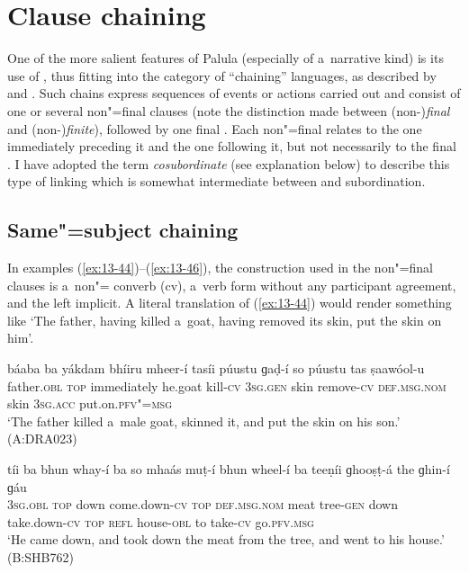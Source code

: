 \section{Clause chaining}
\label{sec:13-3}

One of the more salient features of Palula  (especially of a~narrative kind) is its use of , thus fitting into the category of ``chaining'' languages, as described by \citet[242]{thompsonetal2007} and \citet[374--376]{longacre2007}. Such  chains express sequences of events or actions carried out and consist of one or several non"=final clauses (note the distinction made between (non-)\textit{final} and (non-)\textit{finite}), followed by one final . Each non"=final  relates to the one immediately preceding it and the one following it, but not necessarily to the final . I have adopted the term \textit{cosubordinate} (see explanation below) to describe this type of  linking which is somewhat intermediate between  and subordination.


\subsection{Same"={subject} chaining}
\label{subsec:13-3-1}

In examples (\ref{ex:13-44})--(\ref{ex:13-46}), the construction used in the non"=final clauses is a~non"= converb (cv), a~verb form without any participant agreement, and the  left implicit. A literal translation of (\ref{ex:13-44}) would render something like `The father, having killed a~goat, having removed its skin, put the skin on him'. 

\ea
\label{ex:13-44}
\gll \label{bkm:Ref190770484}{\ob}báaba ba yákdam bhíiru mheer-í{\cb} {\ob}tasíi púustu ɡaḍ-í{\cb} so púustu tas ṣaawóol-u  \\
father.\textsc{obl} \textsc{top} immediately he.goat kill-\textsc{cv} \textsc{3sg.gen} skin  remove-\textsc{cv} \textsc{def.msg.nom} skin \textsc{3sg.acc} put.on.\textsc{pfv"=msg} \\
\glt `The father killed a~male goat, skinned it, and put the skin on his son.' (A:DRA023)

\ex
\label{ex:13-45}
\gll tíi ba {\ob}bhun whay-í ba{\cb} {\ob}so  mhaás muṭ-í bhun wheel-í ba{\cb} {\ob}teeṇíi
  ɡhooṣṭ-á the ɡhin-í{\cb} ɡáu \\
\textsc{3sg.obl} \textsc{top} down come.down-\textsc{cv} \textsc{top} \textsc{def.msg.nom}  meat tree-\textsc{gen} down take.down-\textsc{cv} \textsc{top} \textsc{refl} house-\textsc{obl}  to take-\textsc{cv} go.\textsc{pfv.msg} \\
\glt `He came down, and took down the meat from the tree, and went to his house.' (B:SHB762)

